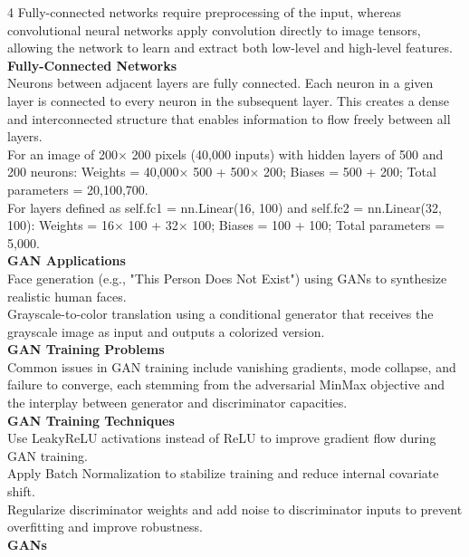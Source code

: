 \documentclass[8pt]{extarticle}
\begin{document}
\begin{multicols}{4}
Fully-connected networks require preprocessing of the input, whereas convolutional neural networks apply convolution directly to image tensors, allowing the network to learn and extract both low-level and high-level features.\\
\vspace{2pt}\textbf{Fully-Connected Networks}\\
Neurons between adjacent layers are fully connected. Each neuron in a given layer is connected to every neuron in the subsequent layer. This creates a dense and interconnected structure that enables information to flow freely between all layers.\\
For an image of 200$\times$ 200 pixels (40,000 inputs) with hidden layers of 500 and 200 neurons: Weights = 40,000$\times$ 500 + 500$\times$ 200; Biases = 500 + 200; Total parameters = 20,100,700.\\
For layers defined as self.fc1 = nn.Linear(16, 100) and self.fc2 = nn.Linear(32, 100): Weights = 16$\times$ 100 + 32$\times$ 100; Biases = 100 + 100; Total parameters = 5,000.\\
\vspace{2pt}\textbf{GAN Applications}\\
Face generation (e.g., "This Person Does Not Exist") using GANs to synthesize realistic human faces.\\
Grayscale-to-color translation using a conditional generator that receives the grayscale image as input and outputs a colorized version.\\
\vspace{2pt}\textbf{GAN Training Problems}\\
Common issues in GAN training include vanishing gradients, mode collapse, and failure to converge, each stemming from the adversarial MinMax objective and the interplay between generator and discriminator capacities.\\
\vspace{2pt}\textbf{GAN Training Techniques}\\
Use LeakyReLU activations instead of ReLU to improve gradient flow during GAN training.\\
Apply Batch Normalization to stabilize training and reduce internal covariate shift.\\
Regularize discriminator weights and add noise to discriminator inputs to prevent overfitting and improve robustness.\\
\vspace{2pt}\textbf{GANs}\\


\end{multicols}
\end{document}
